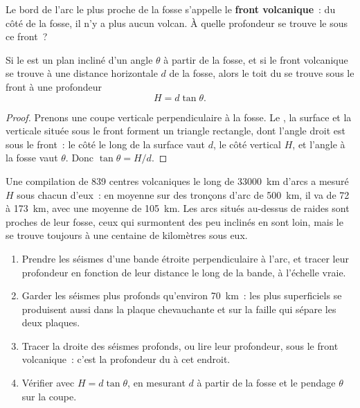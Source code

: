 Le bord de l'arc le plus proche de la fosse s'appelle le \textbf{front
volcanique}~: du côté de la fosse, il n'y a plus aucun volcan. À quelle
profondeur se trouve le  sous ce front~?

\begin{proposition}\label{prop:g12:subduction-magmatism:depth}
Si le  est un plan incliné d'un angle $\theta$ à partir de
la fosse, et si le front volcanique se trouve à une distance horizontale $d$
de la fosse, alors le toit du  se trouve sous le front à une
profondeur
\[
  H = d \tan\theta .
\]
\end{proposition}

\begin{proof}
Prenons une coupe verticale perpendiculaire à la fosse. Le , la surface et la verticale située sous le front forment un
triangle rectangle, dont l'angle droit est sous le front~: le côté le long
de la surface vaut $d$, le côté vertical $H$, et l'angle à la fosse vaut
$\theta$. Donc $\tan\theta = H/d$.
\end{proof}

Une compilation de 839 centres volcaniques le long de \qty{33000}{km}
d'arcs a mesuré $H$ sous chacun d'eux~: en moyenne sur des tronçons d'arc
de \qty{500}{km}, il va de 72 à \qty{173}{km}, avec une moyenne de
\qty{105}{km}. Les arcs situés au-dessus de  raides sont proches de
leur fosse, ceux qui surmontent des  peu inclinés en sont loin, mais
le  se trouve toujours à une centaine de kilomètres sous
eux.

\begin{method}\label{met:g12:subduction-magmatism:slab}
\begin{enumerate}
  \item Prendre les séismes d'une bande étroite perpendiculaire à l'arc, et
        tracer leur profondeur en fonction de leur distance le long de la
        bande, à l'échelle vraie.
  \item Garder les séismes plus profonds qu'environ \qty{70}{km}~: les plus
        superficiels se produisent aussi dans la plaque chevauchante et sur
        la faille qui sépare les deux plaques.
  \item Tracer la droite des séismes profonds, ou lire leur profondeur, sous
        le front volcanique~: c'est la profondeur du  à cet endroit.
  \item Vérifier avec $H = d\tan\theta$, en mesurant $d$ à partir de la
        fosse et le pendage $\theta$ sur la coupe.
\end{enumerate}
\end{method}

